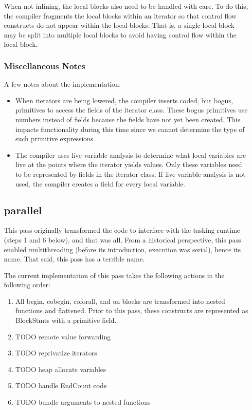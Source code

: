 \documentclass[10pt]{article}
\begin{document}
When not inlining, the local blocks also need to be handled with care.
To do this, the compiler fragments the local blocks within an iterator
so that control flow constructs do not appear within the local blocks.
That is, a single local block may be split into multiple local blocks
to avoid having control flow within the local block.

\subsubsection{Miscellaneous Notes}

A few notes about the implementation:
\begin{itemize}
\item When iterators are being lowered, the compiler inserts coded,
  but bogus,  primitives to access the fields of the
  iterator class.  These bogus primitives use numbers instead of
  fields because the fields have not yet been created.  This impacts
  functionality during this time since we cannot determine the type of
  such primitive expressions.
\item The compiler uses live variable analysis to determine what local
  variables are live at the points where the iterator yields values.
  Only these variables need to be represented by fields in the
  iterator class.  If live variable analysis is not used, the compiler
  creates a field for every local variable.
\end{itemize}

\subsection{parallel}

This pass originally transformed the code to interface with the
tasking runtime (steps 1 and 6 below), and that was all.  From a
historical perspective, this pass enabled multithreading (before its
introduction, execution was serial), hence its name.  That said, this
pass has a terrible name.

The current implementation of this pass takes the following actions in
the following order:
\begin{enumerate}
\item All begin, cobegin, coforall, and on blocks are transformed into
  nested functions and flattened.  Prior to this pass, these
  constructs are represented as BlockStmts with a primitive
   field.
\item TODO remote value forwarding
\item TODO reprivatize iterators
\item TODO heap allocate variables
\item TODO handle EndCount code
\item TODO bundle arguments to nested functions
\end{enumerate}
\end{document}
